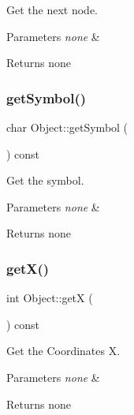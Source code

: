Get the next node. 


\begin{DoxyParams}{Parameters}
{\em none} & \\
\hline
\end{DoxyParams}
\begin{DoxyReturn}{Returns}
none 
\end{DoxyReturn}
\mbox{\label{class_object_a78ae01107b8544f5c4590afb90f38258}} 
\subsubsection{\texorpdfstring{get\+Symbol()}{getSymbol()}}
{\footnotesize\ttfamily char Object\+::get\+Symbol (\begin{DoxyParamCaption}{ }\end{DoxyParamCaption}) const}



Get the symbol. 


\begin{DoxyParams}{Parameters}
{\em none} & \\
\hline
\end{DoxyParams}
\begin{DoxyReturn}{Returns}
none 
\end{DoxyReturn}
\mbox{\label{class_object_a66bac5f818d4d7c05aa457e246e4ca7b}} 
\subsubsection{\texorpdfstring{get\+X()}{getX()}}
{\footnotesize\ttfamily int Object\+::getX (\begin{DoxyParamCaption}{ }\end{DoxyParamCaption}) const}



Get the Coordinates X. 


\begin{DoxyParams}{Parameters}
{\em none} & \\
\hline
\end{DoxyParams}
\begin{DoxyReturn}{Returns}
none 
\end{DoxyReturn}
\mbox{\label{class_object_a81accadc2226d0e6c41c09dccc7a5f5e}} 
